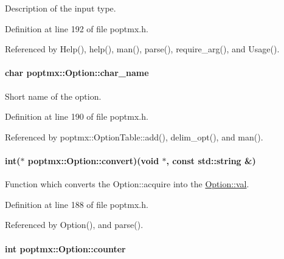 Description of the input type. 



Definition at line 192 of file poptmx.h.



Referenced by Help(), help(), man(), parse(), require\_\-arg(), and Usage().

\hypertarget{classpoptmx_1_1Option_ae7e0ca795185ac4b4b20bc6766760a4a}{
\paragraph[{char\_\-name}]{\setlength{\rightskip}{0pt plus 5cm}char {\bf poptmx::Option::char\_\-name}}\hfill}
\label{classpoptmx_1_1Option_ae7e0ca795185ac4b4b20bc6766760a4a}


Short name of the option. 



Definition at line 190 of file poptmx.h.



Referenced by poptmx::OptionTable::add(), delim\_\-opt(), and man().

\hypertarget{classpoptmx_1_1Option_a2b02579efd2148ce002d0c5833864795}{
\paragraph[{convert}]{\setlength{\rightskip}{0pt plus 5cm}int($\ast$ {\bf poptmx::Option::convert})(void $\ast$, const std::string \&)}\hfill}
\label{classpoptmx_1_1Option_a2b02579efd2148ce002d0c5833864795}


Function which converts the Option::acquire into the \hyperlink{classpoptmx_1_1Option_a8bf55fc70387f6c8929538f420d99658}{Option::val}. 



Definition at line 188 of file poptmx.h.



Referenced by Option(), and parse().

\hypertarget{classpoptmx_1_1Option_a00528f25b80ce6f9959418c5ef4c4c44}{
\paragraph[{counter}]{\setlength{\rightskip}{0pt plus 5cm}int {\bf poptmx::Option::counter}}\hfill}
\label{classpoptmx_1_1Option_a00528f25b80ce6f9959418c5ef4c4c44}


